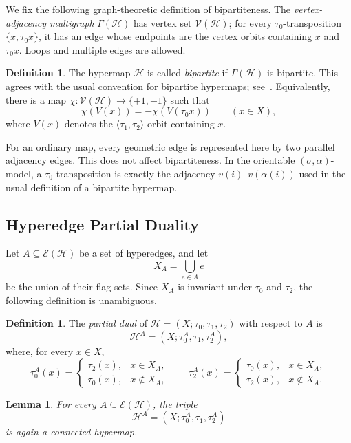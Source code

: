 \documentclass{article}
\newtheorem{lemma}[theorem]{Lemma}
\theoremstyle{definition}
\newtheorem{definition}[theorem]{Definition}
\theoremstyle{remark}
\newcommand{\Hcal}{\mathcal{H}}
\newcommand{\Ecal}{\mathcal{E}}
\newcommand{\Vcal}{\mathcal{V}}
\begin{document}
We fix the following graph-theoretic definition of bipartiteness. The \emph{vertex-adjacency multigraph} $\Gamma(\Hcal)$ has vertex set $\Vcal(\Hcal)$; for every $\tau_0$-transposition $\{x,\tau_0x\}$, it has an edge whose endpoints are the vertex orbits containing $x$ and $\tau_0x$. Loops and multiple edges are allowed.

\begin{definition}\label{def:bipartite}
The hypermap $\Hcal$ is called \emph{bipartite} if $\Gamma(\Hcal)$ is bipartite. This agrees with the usual convention for bipartite hypermaps; see~\cite{Walsh1975,BredaDuarte2007}. Equivalently, there is a map $\chi:\Vcal(\Hcal)\to\{+1,-1\}$ such that
\[
  \chi(V(x))=-\chi(V(\tau_0x))\qquad(x\in X),
\]
where $V(x)$ denotes the $\langle\tau_1,\tau_2\rangle$-orbit containing $x$.
\end{definition}

For an ordinary map, every geometric edge is represented here by two parallel adjacency edges. This does not affect bipartiteness. In the orientable $(\sigma,\alpha)$-model, a $\tau_0$-transposition is exactly the adjacency $v(i)$--$v(\alpha(i))$ used in the usual definition of a bipartite hypermap.

\subsection{Hyperedge Partial Duality}

Let $A\subseteq\Ecal(\Hcal)$ be a set of hyperedges, and let
\[
  X_A=\bigcup_{e\in A}e
\]
be the union of their flag sets. Since $X_A$ is invariant under $\tau_0$ and $\tau_2$, the following definition is unambiguous.

\begin{definition}\label{def:partial-dual}
The \emph{partial dual} of $\Hcal=(X;\tau_0,\tau_1,\tau_2)$ with respect to $A$ is
\[
  \Hcal^A=(X;\tau_0^A,\tau_1,\tau_2^A),
\]
where, for every $x\in X$,
\[
 \tau_0^A(x)=
 \begin{cases}
   \tau_2(x),&x\in X_A,\\
   \tau_0(x),&x\notin X_A,
 \end{cases}
 \qquad
 \tau_2^A(x)=
 \begin{cases}
   \tau_0(x),&x\in X_A,\\
   \tau_2(x),&x\notin X_A.
 \end{cases}
\]
\end{definition}

\begin{lemma}\label{lem:partial-dual-hypermap}
For every $A\subseteq\Ecal(\Hcal)$, the triple
\[
  \Hcal^A=(X;\tau_0^A,\tau_1,\tau_2^A)
\]
is again a connected hypermap.
\end{lemma}
\end{document}
